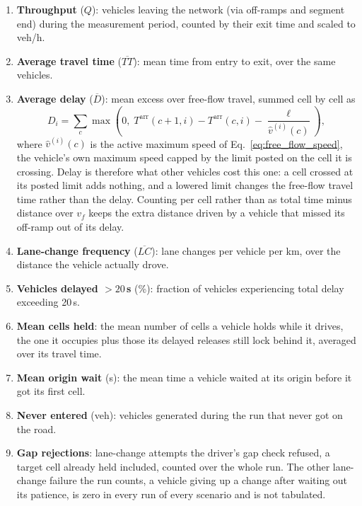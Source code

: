 \documentclass[review,number]{elsarticle}
\newcommand{\Tarr}{T^{\text{arr}}}
\begin{document}
\begin{enumerate}
    \item \textbf{Throughput} ($Q$): vehicles leaving the network (via off-ramps and segment end) during the measurement period, counted by their exit time and scaled to veh/h.
    \item \textbf{Average travel time} ($\overline{TT}$): mean time from entry to exit, over the same vehicles.
    \item \textbf{Average delay} ($\overline{D}$): mean excess over free-flow travel, summed cell by cell as
    \begin{equation}
        D_i = \sum_{c} \max\!\left(0,\; \Tarr(c+1,i) - \Tarr(c,i) - \frac{\ell}{\hat{v}^{(i)}(c)}\right),
        \label{eq:delay}
    \end{equation}
    where $\hat{v}^{(i)}(c)$ is the active maximum speed of Eq.~\ref{eq:free_flow_speed}, the vehicle's own maximum speed capped by the limit posted on the cell it is crossing. Delay is therefore what other vehicles cost this one: a cell crossed at its posted limit adds nothing, and a lowered limit changes the free-flow travel time rather than the delay. Counting per cell rather than as total time minus distance over $v_f$ keeps the extra distance driven by a vehicle that missed its off-ramp out of its delay.
    \item \textbf{Lane-change frequency} ($\overline{LC}$): lane changes per vehicle per km, over the distance the vehicle actually drove.
    \item \textbf{Vehicles delayed $> 20$\,s} (\%): fraction of vehicles experiencing total delay exceeding 20\,s.
    \item \textbf{Mean cells held}: the mean number of cells a vehicle holds while it drives, the one it occupies plus those its delayed releases still lock behind it, averaged over its travel time.
    \item \textbf{Mean origin wait} (s): the mean time a vehicle waited at its origin before it got its first cell.
    \item \textbf{Never entered} (veh): vehicles generated during the run that never got on the road.
    \item \textbf{Gap rejections}: lane-change attempts the driver's gap check refused, a target cell already held included, counted over the whole run. The other lane-change failure the run counts, a vehicle giving up a change after waiting out its patience, is zero in every run of every scenario and is not tabulated.
\end{enumerate}
\end{document}
